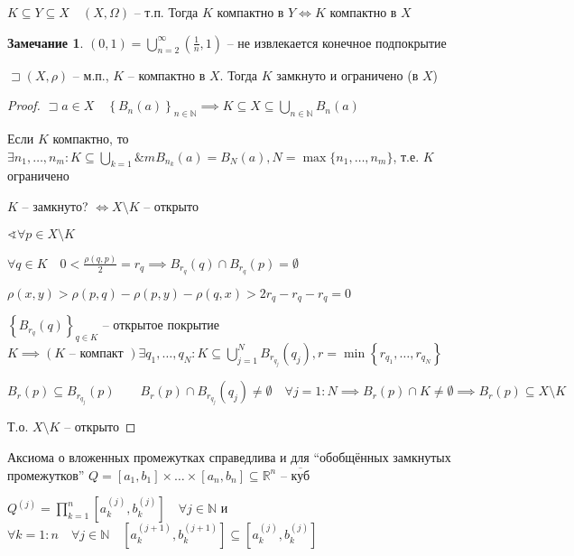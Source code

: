 \documentclass{book}
\newcommand\N{\ensuremath{\mathbb{N}}}
\newcommand\R{\ensuremath{\mathbb{R}}}
\renewcommand\O{\ensuremath{\emptyset}}
\theoremstyle{definition}
\newtheorem*{note}{Замечание}
\begin{document}
\begin{corollary}
    $K\subseteq Y\subseteq X\quad (X, \Omega)$ -- т.п. Тогда $K$ компактно в  $Y \iff  K$ компактно в $X$
\end{corollary}
\begin{note}
    $(0,1) = \bigcup\limits_{n=2}^{\infty }\left( \frac{1}{n}, 1 \right)  $ -- не извлекается конечное подпокрытие
\end{note}
\begin{statement} \label{st3}
    $\sqsupset (X, \rho)$ -- м.п., $K$ -- компактно в  $X$. Тогда  $K$ замкнуто и ограничено (в  $X$)
\end{statement}
\begin{proof}
    $\sqsupset a\in X\quad \left\{ B_n(a) \right\} _{n\in \N } \implies  K\subseteq X\subseteq \bigcup\limits_{n\in \N } B_n(a)$

    Если $K$ компактно, то  $\exists n_1, \ldots, n_m: K\subseteq \bigcup\limits_{k=1}\&m B_{n_k}(a) = B_N(a), N = \max\{n_1, \ldots, n_m\}$, т.е. $K$ ограничено

     $K$ -- замкнуто?  $\iff X\setminus K$ -- открыто

     $\sphericalangle \forall p\in X\setminus K$

     $\forall q\in K\quad 0<\frac{\rho(q,p)}{2} = r_q \implies B_{r_q}(q)\cap B_{r_q}(p) = \O $ 

     $\rho(x,y) >\rho(p,q) - \rho(p,y) - \rho(q,x) >2r_q-r_q-r_q=0$

     $\left\{ B_{r_q}(q) \right\} _{q\in K}$ -- открытое покрытие $K \implies \left( K \text{ -- компакт } \right)  \exists q_1, \ldots, q_N: K\subseteq \bigcup\limits_{j=1}^N B_{r_{q_j}}(q_j), r = \min\left\{ r_{q_1}, \ldots, r_{q_N} \right\}  $ 

     $B_r(p)\subseteq B_{r_{q_j}} (p)\qquad B_r(p)\cap B_{r_{q_j}}(q_j) \neq \O \quad \forall j=1:N \implies  B_{r}(p)\cap K\neq \O  \implies  B_r(p)\subseteq X\setminus K$

     Т.о. $X\setminus K$ -- открыто
\end{proof}

Аксиома о вложенных промежутках справедлива и для ``обобщённых замкнутых промежутков''  $Q = [a_1, b_1]\times \ldots\times [a_n, b_n] \subseteq \R^n$ -- $\overline{\text{куб}}$

$Q^{\left( j \right) } = \prod_{k=1}^{n} [a_k^{\left( j \right) }, b_k^{\left( j \right)}] \quad \forall j\in \N $ и $\forall k=1:n\quad \forall j\in \N \quad \left[ a_k^{\left( j+1 \right) }, b_k^{\left( j+1 \right) } \right] \subseteq\left[ a_k^{\left( j\right) }, b_k^{\left( j \right) } \right] $
\end{document}
